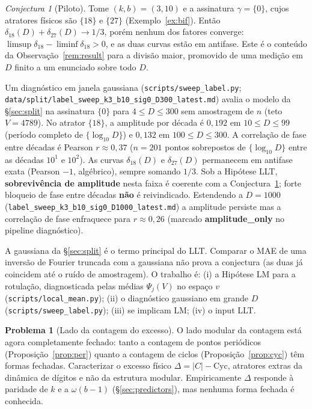 \documentclass[11pt]{article}
\theoremstyle{definition}
\newtheorem{problem}[theorem]{Problema}
\theoremstyle{remark}
\newtheorem{conjecture}[theorem]{Conjectura}
\newcommand{\Cyc}{\mathrm{Cyc}}
\begin{document}
\begin{conjecture}[Piloto]\label{con:splitpilot}
Tome $(k,b)=(3,10)$ e a assinatura $\gamma=\{0\}$, cujos atratores físicos são $\{18\}$ e $\{27\}$ (Exemplo~\ref{ex:bif}). Então $\delta_{18}(D)+\delta_{27}(D)\to 1/3$, porém nenhum dos fatores converge: $\limsup\delta_{18}-\liminf\delta_{18}>0$, e as duas curvas estão em antifase. Este é o conteúdo da Observação~\ref{rem:result} para a divisão maior, promovido de uma medição em $D$ finito a um enunciado sobre todo $D$.

Um diagnóstico em janela gaussiana (\texttt{scripts/sweep\_label.py}; \texttt{data/split/label\_sweep\_k3\_b10\_sig0\_D300\_latest.md}) avalia o modelo da \S\ref{sec:split} na assinatura $\{0\}$ para $4 \le D \le 300$ sem amostragem de $n$ (teto $V=4789$). No atrator $\{18\}$, a amplitude por década é $0{,}192$ em $10 \le D \le 99$ (período completo de $\{\log_{10} D\}$) e $0{,}132$ em $100 \le D \le 300$. A correlação de fase entre décadas é Pearson $r \approx 0{,}37$ ($n=201$ pontos sobrepostos de $\{\log_{10} D\}$ entre as décadas $10^1$ e $10^2$). As curvas $\delta_{18}(D)$ e $\delta_{27}(D)$ permanecem em antifase exata (Pearson $-1$, algébrico), sempre somando $1/3$. Sob a Hipótese LLT, \textbf{sobrevivência de amplitude} nesta faixa é coerente com a Conjectura~\ref{con:splitpilot}; forte bloqueio de fase entre décadas \textbf{não} é reivindicado. Estendendo a $D=1000$ (\texttt{label\_sweep\_k3\_b10\_sig0\_D1000\_latest.md}) a amplitude persiste mas a correlação de fase enfraquece para $r \approx 0{,}26$ (marcado \textbf{amplitude\_only} no pipeline diagnóstico).
\end{conjecture}

A gaussiana da \S\ref{sec:split} é o termo principal do LLT. Comparar o MAE de uma inversão de Fourier truncada com a gaussiana não prova a conjectura (as duas já coincidem até o ruído de amostragem). O trabalho é: (i) a Hipótese LM para a rotulação, diagnosticada pelas médias $\Psi_j(V)$ no espaço $v$ (\texttt{scripts/local\_mean.py}); (ii) o diagnóstico gaussiano em grande $D$ (\texttt{scripts/sweep\_label.py}); (iii) se \cite{delange,drmota-poly,drmota-grabner} implicam LM; (iv) o input LLT.

\begin{problem}[Lado da contagem do excesso]\label{prob:excess}
O lado modular da contagem está agora completamente fechado: tanto a contagem de pontos periódicos (Proposição~\ref{prop:per}) quanto a contagem de ciclos (Proposição~\ref{prop:cyc}) têm formas fechadas. Caracterizar o excesso físico $\Delta = |C| - \Cyc$, atratores extras da dinâmica de dígitos e não da estrutura modular. Empiricamente $\Delta$ responde à paridade de $k$ e a $\omega(b-1)$ (\S\ref{sec:predictors}), mas nenhuma forma fechada é conhecida.
\end{problem}
\end{document}
